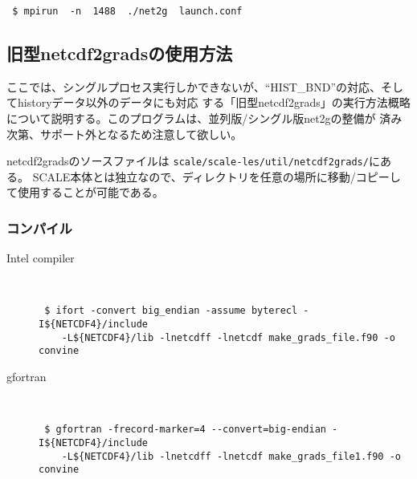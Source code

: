 \begin{verbatim}
 $ mpirun  -n  1488  ./net2g  launch.conf
\end{verbatim}



\subsection{旧型netcdf2gradsの使用方法}
ここでは、シングルプロセス実行しかできないが、``HIST\_BND''の対応、そしてhistoryデータ以外のデータにも対応
する「旧型netcdf2grads」の実行方法概略について説明する。このプログラムは、並列版/シングル版net2gの整備が
済み次第、サポート外となるため注意して欲しい。

netcdf2gradsのソースファイルは \verb|scale/scale-les/util/netcdf2grads/|にある。
SCALE本体とは独立なので、ディレクトリを任意の場所に移動/コピーして使用することが可能である。

\subsubsection{コンパイル}
\begin{description}
\item[Intel compiler]\mbox{}\\
 \begin{verbatim}
 $ ifort -convert big_endian -assume byterecl -I${NETCDF4}/include 
    -L${NETCDF4}/lib -lnetcdff -lnetcdf make_grads_file.f90 -o convine
  \end{verbatim}
\item[gfortran]\mbox{}\\
\begin{verbatim}
 $ gfortran -frecord-marker=4 --convert=big-endian -I${NETCDF4}/include
    -L${NETCDF4}/lib -lnetcdff -lnetcdf make_grads_file1.f90 -o convine
\end{verbatim}
\end{description}


